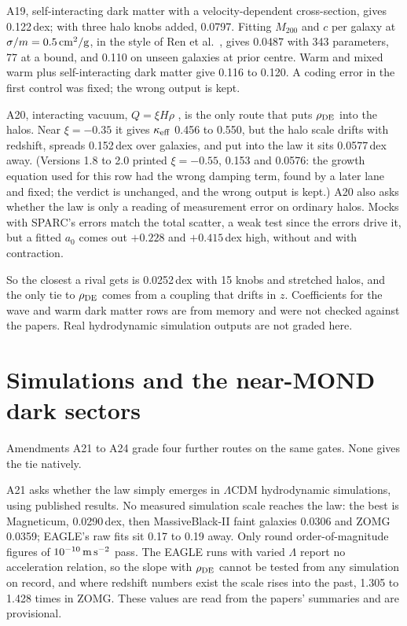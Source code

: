 \documentclass[11pt]{article}
\begin{document}
A19, self-interacting dark matter with a velocity-dependent cross-section, gives 0.122\,dex; with three halo knobs added, 0.0797. Fitting $M_{200}$ and $c$ per galaxy at $\sigma/m=0.5\,{\rm cm^2/g}$, in the style of Ren et al.\ \cite{ren19}, gives 0.0487 with 343 parameters, 77 at a bound, and 0.110 on unseen galaxies at prior centre. Warm and mixed warm plus self-interacting dark matter give 0.116 to 0.120. A coding error in the first control was fixed; the wrong output is kept.

A20, interacting vacuum, $Q=\xi H\rho$ \cite{wang16}, is the only route that puts $\rho_{\rm DE}$ into the halos. Near $\xi=-0.35$ it gives $\kappa_{\rm eff}$ 0.456 to 0.550, but the halo scale drifts with redshift, spreads 0.152\,dex over galaxies, and put into the law it sits 0.0577\,dex away. (Versions 1.8 to 2.0 printed $\xi=-0.55$, 0.153 and 0.0576: the growth equation used for this row had the wrong damping term, found by a later lane and fixed; the verdict is unchanged, and the wrong output is kept.) A20 also asks whether the law is only a reading of measurement error on ordinary halos. Mocks with SPARC's errors match the total scatter, a weak test since the errors drive it, but a fitted $a_0$ comes out $+0.228$ and $+0.415$\,dex high, without and with contraction.

So the closest a rival gets is 0.0252\,dex with 15 knobs and stretched halos, and the only tie to $\rho_{\rm DE}$ comes from a coupling that drifts in $z$. Coefficients for the wave and warm dark matter rows are from memory and were not checked against the papers. Real hydrodynamic simulation outputs are not graded here.

\section{Simulations and the near-MOND dark sectors}
Amendments A21 to A24 grade four further routes on the same gates. None gives the tie natively.

A21 asks whether the law simply emerges in $\Lambda$CDM hydrodynamic simulations, using published results. No measured simulation scale reaches the law: the best is Magneticum, 0.0290\,dex, then MassiveBlack-II faint galaxies 0.0306 and ZOMG 0.0359; EAGLE's raw fits sit 0.17 to 0.19 away. Only round order-of-magnitude figures of $10^{-10}\,{\rm m\,s^{-2}}$ pass. The EAGLE runs with varied $\Lambda$ report no acceleration relation, so the slope with $\rho_{\rm DE}$ cannot be tested from any simulation on record, and where redshift numbers exist the scale rises into the past, 1.305 to 1.428 times in ZOMG. These values are read from the papers' summaries and are provisional.
\end{document}
